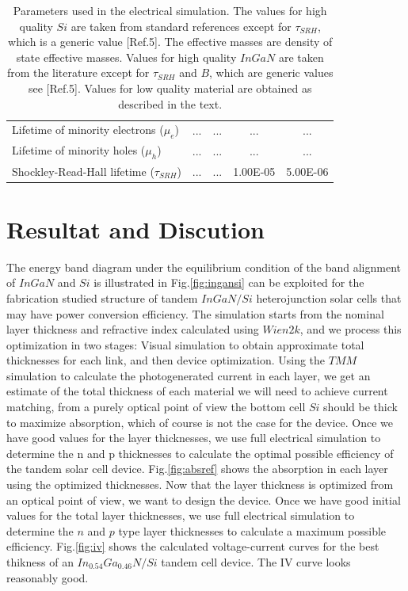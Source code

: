 \documentclass[preprint,12pt]{elsarticle}
\begin{document}
\begin{table}[h!]
\begin{tabular}{@{}lcccc@{}}
		Lifetime of minority electrons  ($\mu_{e}$) & ... & ... & ... & ... \\
		Lifetime of minority holes ($\mu_{h}$) & ... & ... & ... & ... \\
		Shockley-Read-Hall lifetime ($\tau_{SRH}$) & ... & ... & 1.00E-05 & 5.00E-06 \\ \bottomrule
	\end{tabular}
	\caption{Parameters used in the electrical simulation. The values for high quality $Si$ are taken from standard references except for
		$\tau_{SRH}$, which is a generic value [Ref.5]. The effective masses are density of state effective masses. Values for high quality $InGaN$ are taken from the literature except for $\tau_{SRH}$ and $B$, which are generic values see [Ref.5]. Values for low quality material are obtained as described in the text.}
	\label{tab:parametres}
\end{table}

\section{Resultat and Discution} \label{sec:R_D}
The energy band diagram under the equilibrium condition of the band alignment of $InGaN$ and $Si$ is illustrated in Fig.\ref{fig:ingansi} can be exploited for the fabrication studied structure of tandem $InGaN/Si$ heterojunction solar cells that may have power conversion efficiency. The simulation starts from the nominal layer thickness and refractive index calculated using $Wien2k$, and we process this optimization in two stages: Visual simulation to obtain approximate total thicknesses for each link, and then device optimization. Using the $TMM$ simulation to calculate the photogenerated current in each layer, we get an estimate of the total thickness of each material we will need to achieve current matching, from a purely optical point of view the bottom cell $Si$ should be thick to maximize absorption, which of course is not the case for the device. Once we have good values for the layer thicknesses, we use full electrical simulation to determine the n and p thicknesses to calculate the optimal possible efficiency of the tandem solar cell device. Fig.\ref{fig:absref} shows the absorption in each layer using the optimized thicknesses. Now that the layer thickness is optimized from an optical point of view, we want to design the device. Once we have good initial values for the total layer thicknesses, we use full electrical simulation to determine the $n$ and $p$ type layer thicknesses to calculate a maximum possible efficiency. Fig.\ref{fig:iv} shows the calculated voltage-current curves for the best thikness of an $In_{0.54}Ga_{0.46}N/Si$ tandem cell device. The IV curve looks reasonably good.
\end{document}
